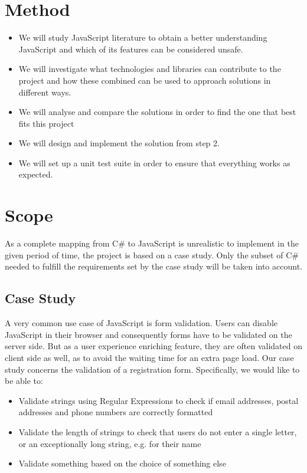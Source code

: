\section{Method}
	\begin{itemize}
	\item We will study JavaScript literature to obtain a better understanding JavaScript and which of its features can be considered unsafe. 
	\item We will investigate what technologies and libraries can contribute to the project and how these combined can be used to approach solutions in different ways.
	\item We will analyse and compare the solutions in order to find the one that best fits this project
	\item We will design and implement the solution from step 2.
	\item We will set up a unit test suite in order to ensure that everything works as expected.
	\end{itemize}

\section{Scope}
	As a complete mapping from C\# to JavaScript is unrealistic to implement in the given period of time, the project is based on a case study. Only the subset of C\# needed to fulfill the requirements set by the case study will be taken into account.

	\subsection{Case Study}
		A very common use case of JavaScript is form validation. Users can disable JavaScript in their browser and consequently forms have to be validated on the server side. But as a user experience enriching feature, they are often validated on client side as well, as to avoid the waiting time for an extra page load. Our case study concerns the validation of a registration form. Specifically, we would like to be able to:

		\begin{itemize}
			\item Validate strings using Regular Expressions to check if email addresses, postal addresses and phone numbers are correctly formatted
			\item Validate the length of strings to check that users do not enter a single letter, or an exceptionally long string, e.g. for their name
			\item Validate something based on the choice of something else
		\end{itemize}


